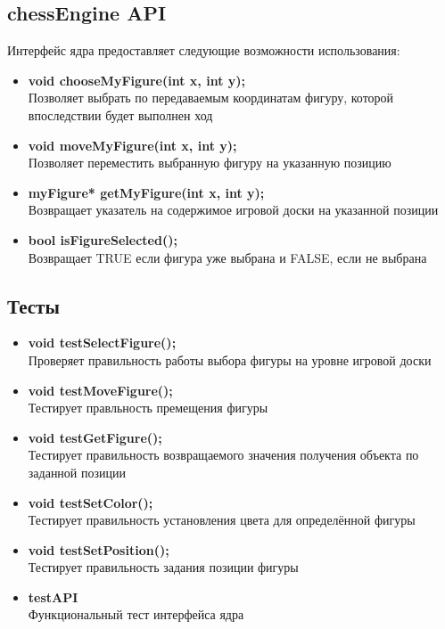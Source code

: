 \subsection*{chessEngine API}
Интерфейс ядра предоставляет следующие возможности использования:
\begin{itemize}
\item\textbf{void chooseMyFigure(int x, int y);}\\
Позволяет выбрать по передаваемым координатам  фигуру, которой впоследствии будет выполнен ход\\
\item\textbf{void moveMyFigure(int x, int y);}\\
Позволяет переместить выбранную фигуру на указанную позицию\\
\item\textbf{myFigure* getMyFigure(int x, int y);}\\
Возвращает указатель на содержимое игровой доски на указанной позиции\\
\item\textbf{bool isFigureSelected();}\\
Возвращает TRUE если фигура уже выбрана и FALSE, если не выбрана\\
\end{itemize}

\subsection*{Тесты}
\begin{itemize}
\item\textbf{void testSelectFigure();}\\
Проверяет правильность работы выбора фигуры на уровне игровой доски\\
\item\textbf{void testMoveFigure();}\\
Тестирует правльность премещения фигуры\\
\item\textbf{void testGetFigure();}\\
Тестирует правильность возвращаемого значения получения объекта по заданной позиции\\
\item\textbf{void testSetColor();}\\
Тестирует правильность установления цвета для определённой фигуры\\
\item\textbf{void testSetPosition();}\\
Тестирует правильность задания позиции фигуры\\
\item\textbf{testAPI}\\
Функциональный тест интерфейса ядра\\
\end{itemize}

